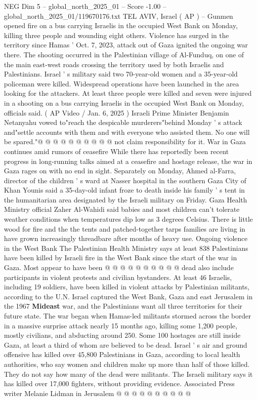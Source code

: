 \begin{textsample}{NEG Dim 5 – global\_north\_2025\_01 – Score -1.00 – global\_north\_2025\_01/119670176.txt}  \label{ex:f5_neg_071}
TEL AVIV, Israel ( AP ) -- Gunmen opened fire on a bus carrying Israelis in the occupied West Bank on Monday, killing three people and wounding eight others.
Violence has surged in the territory since Hamas ' Oct. 7, 2023, attack out of Gaza ignited the ongoing war there.
The shooting occurred in the Palestinian village of Al-Funduq, on one of the main east-west roads crossing the territory used by both Israelis and Palestinians.
Israel ' s military said two 70-year-old women and a 35-year-old policeman were killed.
Widespread operations have been launched in the area looking for the attackers.
At least three people were killed and seven were injured in a shooting on a bus carrying Israelis in the occupied West Bank on Monday, officials said. ( AP Video / Jan. 6, 2025 ) Israeli Prime Minister Benjamin Netanyahu vowed to"reach the despicable murderers"behind Monday ' s attack and"settle accounts with them and with everyone who assisted them.
No one will be spared."@ @ @ @ @ @ @ @ @ @ not claim responsibility for it.
War in Gaza continues amid rumors of ceasefire While there has reportedly been recent progress in long-running talks aimed at a ceasefire and hostage release, the war in Gaza rages on with no end in sight.
Separately on Monday, Ahmed al-Farra, director of the children ' s ward at Nasser hospital in the southern Gaza City of Khan Younis said a 35-day-old infant froze to death inside his family ' s tent in the humanitarian area designated by the Israeli military on Friday.
Gaza Health Ministry official Zaher Al-Wahidi said babies and most children can't tolerate weather conditions when temperatures dip low as 3 degrees Celsius.
There is little wood for fire and the the tents and patched-together tarps families are living in have grown increasingly threadbare after months of heavy use.
Ongoing violence in the West Bank The Palestinian Health Ministry says at least 838 Palestinians have been killed by Israeli fire in the West Bank since the start of the war in Gaza.
Most appear to have been @ @ @ @ @ @ @ @ @ @ dead also include participants in violent protests and civilian bystanders.
At least 46 Israelis, including 19 soldiers, have been killed in violent attacks by Palestinian militants, according to the U.N.
Israel captured the West Bank, Gaza and east Jerusalem in the 1967 \textbf{Mideast} war, and the Palestinians want all three territories for their future state.
The war began when Hamas-led militants stormed across the border in a massive surprise attack nearly 15 months ago, killing some 1,200 people, mostly civilians, and abducting around 250.
Some 100 hostages are still inside Gaza, at least a third of whom are believed to be dead.
Israel ' s air and ground offensive has killed over 45,800 Palestinians in Gaza, according to local health authorities, who say women and children make up more than half of those killed.
They do not say how many of the dead were militants.
The Israeli military says it has killed over 17,000 fighters, without providing evidence.
Associated Press writer Melanie Lidman in Jerusalem @ @ @ @ @ @ @ @ @ @

\end{textsample}

